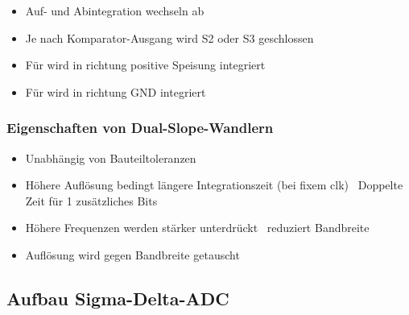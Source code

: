 \begin{minipage}[t]{0.48\columnwidth}
    \begin{itemize}
        \item Auf- und Abintegration wechseln ab
        \item Je nach Komparator-Ausgang wird S2 oder S3 geschlossen
    \end{itemize}
\end{minipage}
\hfill
\begin{minipage}[t]{0.48\columnwidth}
    \begin{itemize}
        \item Für  wird in richtung positive Speisung integriert
        \item Für  wird in richtung GND integriert
    \end{itemize}
\end{minipage}


\subsubsection{Eigenschaften von Dual-Slope-Wandlern}

\begin{minipage}[t]{0.48\columnwidth}
    \begin{itemize}
        \item Unabhängig von Bauteiltoleranzen
        \item Höhere Auflösung bedingt längere Integrationszeit (bei fixem clk) 
            \textrightarrow\ Doppelte Zeit für 1 zusätzliches Bits
    \end{itemize}
\end{minipage}
\hfill
\begin{minipage}[t]{0.48\columnwidth}
    \begin{itemize}
        \item Höhere Frequenzen werden stärker unterdrückt \textrightarrow\ reduziert Bandbreite
        \item Auflösung wird gegen Bandbreite getauscht
    \end{itemize}
\end{minipage}


\subsection{Aufbau Sigma-Delta-ADC}

